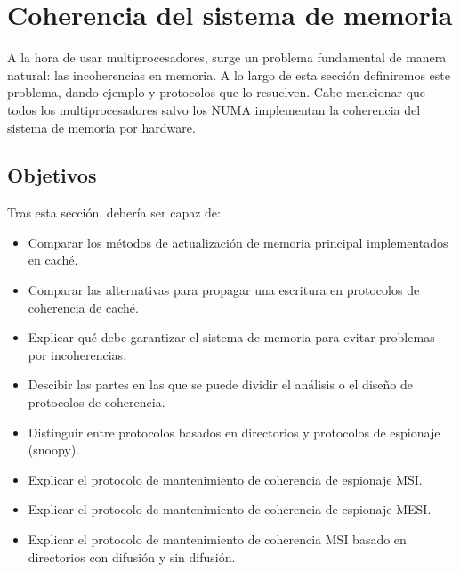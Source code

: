 % 
% 
% 



\newpage
\section{Coherencia del sistema de memoria}
A la hora de usar multiprocesadores, surge un problema fundamental de manera natural: las incoherencias en memoria. A lo largo de esta sección definiremos este problema, dando ejemplo y protocolos que lo resuelven. Cabe mencionar que todos los multiprocesadores salvo los NUMA implementan la coherencia del sistema de memoria por hardware.

\subsection{Objetivos}
Tras esta sección, debería ser capaz de:
\begin{itemize}
    \item Comparar los métodos de actualización de memoria principal implementados en caché.
    \item Comparar las alternativas para propagar una escritura en protocolos de coherencia de caché.
    \item Explicar qué debe garantizar el sistema de memoria para evitar problemas por incoherencias.
    \item Descibir las partes en las que se puede dividir el análisis o el diseño de protocolos de coherencia.
    \item Distinguir entre protocolos basados en directorios y protocolos de espionaje (snoopy).
    \item Explicar el protocolo de mantenimiento de coherencia de espionaje MSI\@.
    \item Explicar el protocolo de mantenimiento de coherencia de espionaje MESI\@.
    \item Explicar el protocolo de mantenimiento de coherencia MSI basado en directorios con difusión y sin difusión.
\end{itemize}

